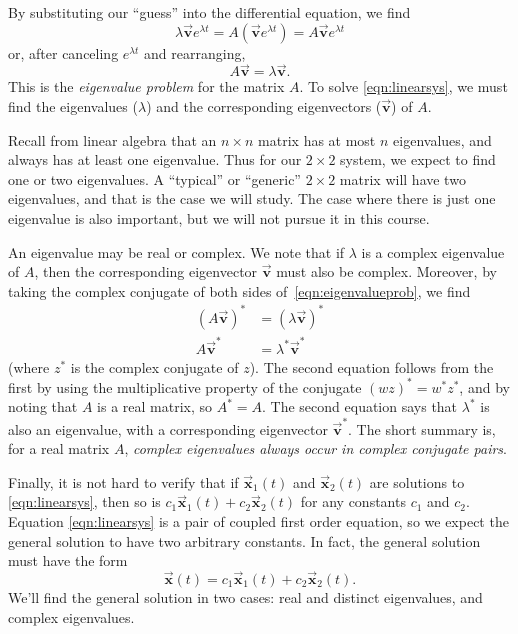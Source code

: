 \documentclass{book}
\newcommand{\BV}{\vec{\textbf{v}}}
\newcommand{\BX}{\vec{\textbf{x}}}
\begin{document}
By substituting our ``guess'' into the differential equation, we
find
\begin{equation}
  \lambda \BV e^{\lambda t} = A\left(\BV e^{\lambda t}\right)
       = A\BV e^{\lambda t}
\end{equation}
or, after canceling $e^{\lambda t}$ and rearranging,
\begin{equation}
   A\BV = \lambda \BV.
\label{eqn:eigenvalueprob}
\end{equation}
This is the \emph{eigenvalue problem}
for the matrix $A$.
To solve \eqref{eqn:linearsys}, we must find
the eigenvalues ($\lambda$) and
the corresponding eigenvectors ($\BV$) of $A$.

Recall from linear algebra that an $n\times n$ matrix
has at most $n$ eigenvalues, and always has at least
one eigenvalue.  Thus for our $2\times 2$
system, we expect to find one or two eigenvalues.
A ``typical'' or ``generic'' $2\times 2$ matrix
will have two eigenvalues, and that is the case
we will study.  The case where there is just one
eigenvalue is also important, but we will not pursue
it in this course.

An eigenvalue may be real or complex. We note that
if $\lambda$ is a complex eigenvalue of $A$, then
the corresponding eigenvector $\BV$ must also be
complex. Moreover, by taking the complex conjugate
of both sides of~\eqref{eqn:eigenvalueprob},
we find
\begin{equation}
\begin{split}
   (A\BV)^* & = (\lambda \BV)^* \\
   A\BV^* & = \lambda^* \BV^*
\end{split}
\end{equation}
(where $z^*$ is the complex conjugate of $z$).
The second equation follows from the first
by using the multiplicative property of the conjugate
$(wz)^* = w^* z^*$, and
by noting that
$A$ is a real matrix, so $A^*=A$.
The second equation says that $\lambda^*$ is also an eigenvalue,
with a corresponding eigenvector $\BV^*$.
The short summary is, for a real matrix $A$,
\emph{complex eigenvalues always occur in complex conjugate
pairs}.

Finally, it is not hard to verify that if $\BX_1(t)$ and
$\BX_2(t)$ are solutions to \eqref{eqn:linearsys}, then
so is $c_1 \BX_1(t) + c_2\BX_2(t)$ for any constants
$c_1$ and $c_2$.  Equation \eqref{eqn:linearsys} is
a pair of coupled first order equation, so we expect the
general solution to have two arbitrary constants.
In fact, the general solution must have the form
\begin{equation}
  \BX(t) = c_1 \BX_1(t) + c_2 \BX_2(t).
\end{equation}
We'll find the general solution in two cases: real and distinct eigenvalues,
and complex eigenvalues.
\end{document}
